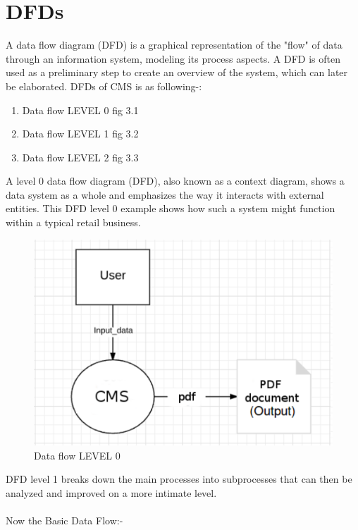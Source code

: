 \section{DFDs}
A data flow diagram (DFD) is a graphical representation of the "flow" of data through an information system, modeling its process aspects. A DFD is often used as a preliminary step to create an overview of the system, which can later be elaborated. DFDs of CMS is as following-:
\begin{enumerate}
\item Data flow LEVEL 0 fig 3.1
\item Data flow LEVEL 1 fig 3.2
\item Data flow LEVEL 2 fig 3.3
\end{enumerate}

A level 0 data flow diagram (DFD), also known as a context diagram, shows a data system as a whole and emphasizes the way it interacts with external entities. This DFD level 0 example shows how such a system might function within a typical retail business.

\begin{figure}[h!]
\centering \includegraphics[scale=0.55]{input/images/cms1.pdf}
\caption{Data flow LEVEL 0}
\label{fig:DFDs}
\end{figure}

DFD level 1 breaks down the main processes into subprocesses that can then be analyzed and improved on a more intimate level.\\\\
Now the Basic Data Flow:-

